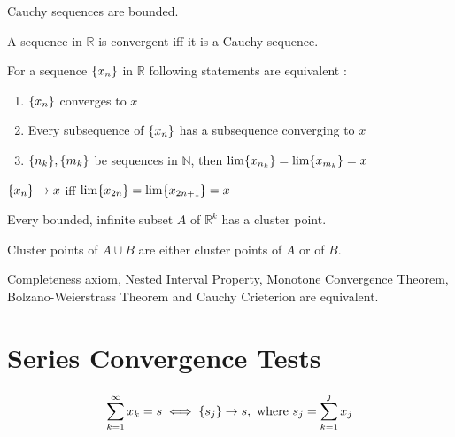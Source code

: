 	\begin{lemma}
		Cauchy sequences are bounded.
	\end{lemma}

	\begin{theorem}[cauchy]
		A sequence in $\mathbb{R}$ is convergent iff it is a Cauchy sequence.
	\end{theorem}

	\begin{remark}
		For a sequence $\sequence{x_n}$ in $\mathbb{R}$ following statements are equivalent :
		\begin{enumerate} 
			\item $\sequence{x_n}$ converges to $x$
			\item Every subsequence of $\sequence{x_n}$ has a subsequence converging to $x$
			\item $\sequence {n_k}, \sequence {m_k}$ be sequences in $\mathbb{N}$, then $\lim \sequence{x_{n_k}} = \lim \sequence{x_{m_k}} = x$
		\end{enumerate}
	\end{remark}

	\begin{remark}
		$\sequence{x_n} \to x$ iff $\lim \sequence{x_{2n}} = \lim \sequence{x_{2n+1}} = x$
	\end{remark}

	\begin{theorem}
		Every bounded, infinite subset $A$ of $\mathbb{R}^k$ has a cluster point.
	\end{theorem}

	\begin{remark}
		Cluster points of $A \cup B$ are either cluster points of $A$ or of $B$.
	\end{remark}

	\begin{remark}
		Completeness axiom, Nested Interval Property, Monotone Convergence Theorem, Bolzano-Weierstrass Theorem and Cauchy Crieterion are equivalent.
	\end{remark}

\section{Series Convergence Tests}
	\begin{definition}[convergence]
		$$\series{x_k}{k} = s \iff \sequence{s_j} \to s,\text{ where } s_j = \sum_{k=1}^j x_j$$
	\end{definition}

